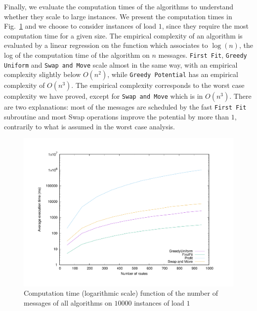 \documentclass[a4paper,UKenglish,cleveref, autoref, thm-restate]{lipics-v2019}
\newcommand\firstfit{\texttt{First Fit}\xspace}
\newcommand\greedyuniform{\texttt{Greedy Uniform}\xspace}
\newcommand\swapandmove{\texttt{Swap and Move}\xspace}
\newcommand\greedypotential{\texttt{Greedy Potential}\xspace}
\begin{document}
 \medskip
 Finally, we evaluate the computation times of the algorithms to understand whether they scale to large instances. We present the computation times in Fig.~\ref{fig:timelog} and we choose to consider instances of load $1$, since they require the most computation time for a given size. The empirical complexity of an algorithm is evaluated by a
 linear regression on the function which associates to $\log(n)$, the log of the computation time of the algorithm on $n$ messages.  \firstfit, \greedyuniform and \swapandmove scale almost in the same way, with an empirical complexity slightly below $O(n^2)$, while \greedypotential has an empirical complexity of $O(n^3)$. The empirical complexity corresponds to the worst case complexity we have proved, except for \swapandmove which is in $O(n^3)$. There are two explanations: most of the messages are scheduled by the fast \firstfit subroutine and most Swap operations improve the potential by more than $1$, contrarily to what is assumed in the worst case analysis.

\begin{figure}
 \begin{center}
\includegraphics[scale=0.275]{log}
\end{center}
\caption{Computation time (logarithmic scale) function of the number of messages of all algorithms on $10000$ instances of load $1$}
\label{fig:timelog}
\end{figure}


 
\end{document}
